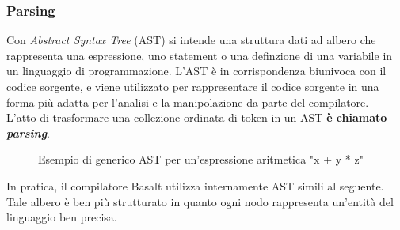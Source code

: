 \subsubsection{Parsing}
Con \textit{Abstract Syntax Tree} (AST) si intende una struttura dati ad albero che rappresenta una espressione, uno statement o una definzione 
di una variabile in un linguaggio di programmazione. L'AST è in corrispondenza biunivoca con il codice sorgente, e viene utilizzato
per rappresentare il codice sorgente in una forma più adatta per l'analisi e la manipolazione da parte del compilatore. \\

L'atto di trasformare una collezione ordinata di token in un AST \textbf{è chiamato \textit{parsing}}.

\begin{figure}[H]
    \centering
    \caption{Esempio di generico AST per un'espressione aritmetica "x + y * z"} 
\end{figure}
\newpage

In pratica, il compilatore Basalt utilizza internamente AST simili al seguente. Tale albero è 
ben più strutturato in quanto ogni nodo rappresenta un'entità del linguaggio ben precisa.

